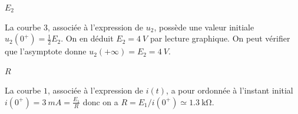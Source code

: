 \begin{enonce}
$E_2$
\end{enonce}


\begin{corrige}
La courbe $3$, associée à l'expression de $u_2$, possède une valeur initiale $u_2(0^+) = \frac12 E_2$. On en déduit $E_2 = \SI{4}{V}$ par lecture graphique.
On peut vérifier que l'asymptote donne $u_2(+\infty)=E_2=\SI{4}{V}$.
\end{corrige}




\begin{enonce}
$R$
\end{enonce}


\begin{corrige}
La courbe $1$, associée à l'expression de $i(t)$, a pour ordonnée à l'instant initial $i(0^+) = \SI{3}{mA} = \frac{E_1}{R}$ donc on a $R = E_1/i(0^+)\simeq\SI{1.3}{\kilo \ohm}$.
\end{corrige}



\finEntrainement



\newpage







